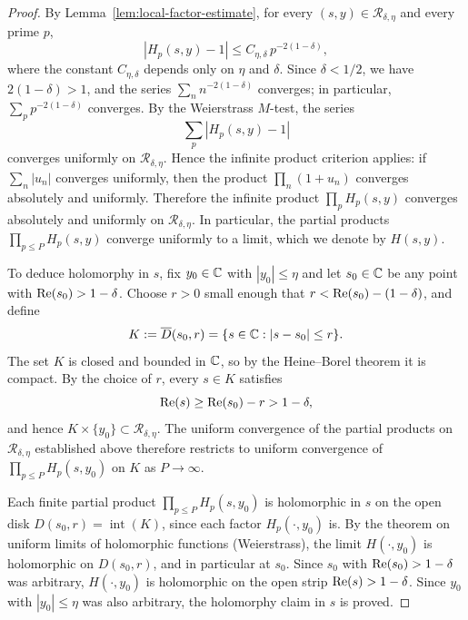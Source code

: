 \begin{proof}
By Lemma~\ref{lem:local-factor-estimate}, for every
$(s, y) \in \mathcal{R}_{\delta, \eta}$ and every prime $p$,
\begin{equation}\label{eq:Hp-bound}
    |H_p(s, y) - 1| \leq C_{\eta, \delta} \, p^{-2(1-\delta)},
\end{equation}
where the constant $C_{\eta, \delta}$ depends only on $\eta$ and
$\delta$. Since $\delta < 1/2$, we have $2(1 - \delta) > 1$, and
the series $\sum_n n^{-2(1-\delta)}$ converges; in particular,
$\sum_p p^{-2(1-\delta)}$ converges. By the Weierstrass $M$-test,
the series
\[
    \sum_p |H_p(s,y)-1|
\]
converges uniformly on $\mathcal{R}_{\delta, \eta}$. Hence the
infinite product criterion applies: if
$\sum_n |u_n|$ converges uniformly, then the product
$\prod_n(1+u_n)$ converges absolutely and uniformly. Therefore the infinite product
$\prod_{p} H_p(s, y)$ converges absolutely and uniformly on
$\mathcal{R}_{\delta, \eta}$. In particular, the partial products $\prod_{p\leq P} H_p(s,y)$ converge uniformly to a limit, which we denote by $H(s, y)$.



To deduce holomorphy in $s$, fix $y_0 \in \mathbb{C}$ with $|y_0| \leq \eta$
and let $s_0 \in \mathbb{C}$ be any point with $\operatorname{Re}(s_0) > 1 - \delta$.
Choose $r > 0$ small enough that $r < \operatorname{Re}(s_0) - (1 - \delta)$,
and define
\begin{equation}\label{eq:K-disk}
    K := \overline{D}(s_0, r)
       = \{s \in \mathbb{C} : |s - s_0| \leq r\}.
\end{equation}
The set $K$ is closed and bounded in $\mathbb{C}$, so by the Heine--Borel
theorem it is compact. By the choice of $r$, every $s \in K$
satisfies
\[
    \operatorname{Re}(s) \geq \operatorname{Re}(s_0) - r > 1 - \delta,
\]
and hence $K \times \{y_0\} \subset \mathcal{R}_{\delta, \eta}$.
The uniform convergence of the partial products on
$\mathcal{R}_{\delta, \eta}$ established above therefore restricts
to uniform convergence of $\prod_{p \leq P} H_p(s, y_0)$ on $K$
as $P \to \infty$.

Each finite partial product $\prod_{p \leq P} H_p(s, y_0)$ is
holomorphic in $s$ on the open disk
$D(s_0, r) = \operatorname{int}(K)$, since each factor
$H_p(\cdot, y_0)$ is. By the theorem on uniform limits of
holomorphic functions (Weierstrass), the limit $H(\cdot, y_0)$ is
holomorphic on $D(s_0, r)$, and in particular at $s_0$. Since
$s_0$ with $\operatorname{Re}(s_0) > 1 - \delta$ was arbitrary, $H(\cdot, y_0)$
is holomorphic on the open strip $\operatorname{Re}(s) > 1 - \delta$. Since
$y_0$ with $|y_0| \leq \eta$ was also arbitrary, the holomorphy
claim in $s$ is proved.


\end{proof}
